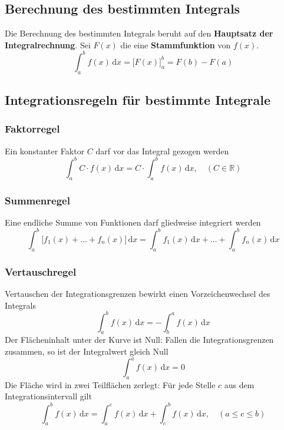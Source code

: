 \subsection{Berechnung des bestimmten Integrals}
Die Berechnung des bestimmten Integrals beruht auf den \textbf{Hauptsatz der Integralrechnung}. Sei $F\left(x\right)$ die eine \textbf{Stammfunktion} von $f\left(x\right)$. 
\begin{equation}
\boxed{\displaystyle \int_a^bf\left(x\right)\,\text{d}x=\Big[F\left(x\right)\Big]_a^b=F\left(b\right)-F\left(a\right)}
\end{equation}
\subsection{Integrationsregeln für bestimmte Integrale}
\subsubsection{Faktorregel}
Ein konstanter Faktor $C$ darf vor das Integral gezogen werden
\begin{equation}
\boxed{\displaystyle \int_a^bC\cdot f\left(x\right)\,\text{d}x=C\cdot \displaystyle \int_a^bf\left(x\right)\,\text{d}x,\quad \left(C\in \mathbb{R}\right)}
\end{equation}
\subsubsection{Summenregel}
Eine endliche Summe von Funktionen darf gliedweise integriert werden
\begin{equation}
\boxed{\displaystyle \int_a^b\Big[f_1\left(x\right)+\dotso+f_n\left(x\right)\Big]\,\text{d}x=\displaystyle \int_a^bf_1\left(x\right)\,\text{d}x+\dotso+\displaystyle \int_a^bf_n\left(x\right)\,\text{d}x}
\end{equation}
\subsubsection{Vertauschregel}
Vertauschen der Integrationsgrenzen bewirkt einen Vorzeichenwechsel des Integrals
\begin{equation}
\boxed{\displaystyle \int_a^bf\left(x\right)\,\text{d}x=-\displaystyle \int_b^af\left(x\right)\,\text{d}x}
\end{equation}
Der Flächeninhalt unter der Kurve ist Null: Fallen die Integrationsgrenzen zusammen, so ist der Integralwert gleich Null
\begin{equation}
\boxed{\displaystyle \int_a^af\left(x\right)\,\text{d}x=0}
\end{equation}
Die Fläche wird in zwei Teilflächen zerlegt: Für jede Stelle $c$ aus dem Integrationsintervall gilt
\begin{equation}
\boxed{\displaystyle \int_a^bf\left(x\right)\,\text{d}x=\displaystyle \int_a^cf\left(x\right)\,\text{d}x+\displaystyle \int_c^bf\left(x\right)\,\text{d}x,\quad \left(a\leq c\leq b\right)}
\end{equation}
